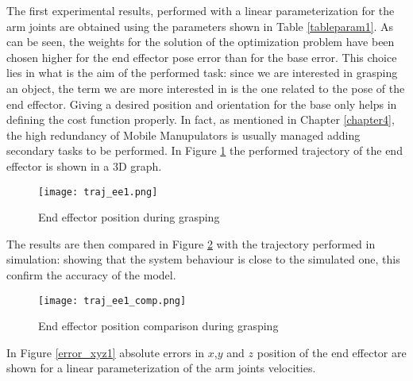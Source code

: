 The first experimental results, performed with a linear parameterization for the arm joints are obtained using the parameters shown in Table \ref{tableparam1}. As can be seen, the weights for the solution of the optimization problem have been chosen higher for the end effector pose error than for the base error. This choice lies in what is the aim of the performed task: since we are interested in grasping an object, the term we are more interested in is the one related to the pose of the end effector. Giving a desired position and orientation for the base only helps in defining the cost function properly. In fact, as mentioned in Chapter \ref{chapter4}, the high redundancy of Mobile Manupulators is usually managed adding secondary tasks to be performed.
In Figure \ref{traj_ee1} the performed trajectory of the end effector is shown in a 3D graph. 
\begin{figure}[h!]
\centering
\texttt{[image: traj\_ee1.png]}
\caption{End effector position during grasping}
\label{traj_ee1}
\end{figure}
The results are then compared in Figure \ref{traj_ee1_comp} with the trajectory performed in simulation: showing that the system behaviour is close to the simulated one, this confirm the accuracy of the model. 
\begin{figure}[h!]
	\centering
	\texttt{[image: traj\_ee1\_comp.png]}
	\caption{End effector position comparison during grasping}
	\label{traj_ee1_comp}
\end{figure} 
In Figure \ref{error_xyz1} absolute errors in $x$,$y$ and $z$ position of the end effector are shown for a linear parameterization of the arm joints velocities.

